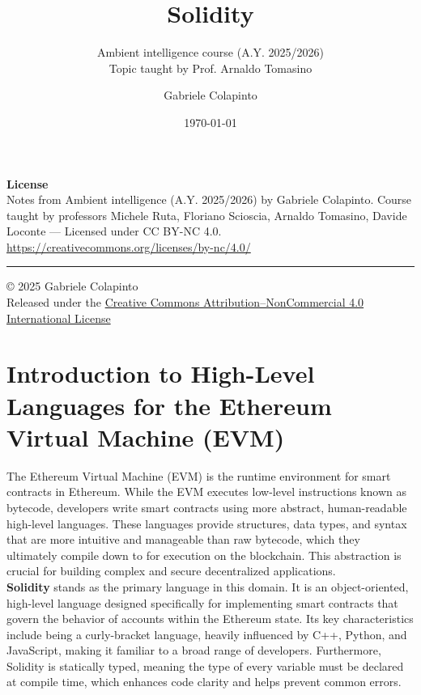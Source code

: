 \documentclass{scrbook}
\title{Solidity}
\subtitle{Ambient intelligence course (A.Y. 2025/2026)\\Topic taught by Prof. Arnaldo Tomasino}
\author{Gabriele Colapinto}
\date{\today}
\begin{document}
\maketitle
\thispagestyle{empty}

{\Large\textbf{License}} \\
{Notes from Ambient intelligence (A.Y. 2025/2026) by Gabriele Colapinto. 
Course taught by professors Michele Ruta, Floriano Scioscia, Arnaldo Tomasino, Davide Loconte — 
Licensed under CC BY-NC 4.0.\\
\url{https://creativecommons.org/licenses/by-nc/4.0/}}

\vspace*{\fill}
\rule{\textwidth}{0.2pt}
\small{© 2025 Gabriele Colapinto \\
Released under the \href{https://creativecommons.org/licenses/by-nc/4.0/}{Creative Commons Attribution–NonCommercial 4.0 International License}}

\clearpage

\tableofcontents

\chapter{Introduction to High-Level Languages for the Ethereum Virtual Machine (EVM)}

The Ethereum Virtual Machine (EVM) is the runtime environment for smart contracts in Ethereum. While the EVM executes low-level instructions known as bytecode, developers write smart contracts using more abstract, human-readable high-level languages. These languages provide structures, data types, and syntax that are more intuitive and manageable than raw bytecode, which they ultimately compile down to for execution on the blockchain. This abstraction is crucial for building complex and secure decentralized applications.\\

\textbf{Solidity} stands as the primary language in this domain. It is an object-oriented, high-level language designed specifically for implementing smart contracts that govern the behavior of accounts within the Ethereum state. Its key characteristics include being a curly-bracket language, heavily influenced by C++, Python, and JavaScript, making it familiar to a broad range of developers. Furthermore, Solidity is statically typed, meaning the type of every variable must be declared at compile time, which enhances code clarity and helps prevent common errors.\\
\end{document}
